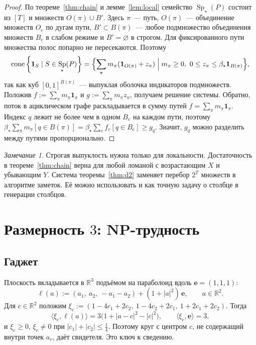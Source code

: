 \documentclass[a4paper,11pt]{article}
\theoremstyle{plain}
\theoremstyle{definition}
\theoremstyle{remark}
\newtheorem*{remark}{Замечание}
\newcommand{\R}{\mathbb{R}}
\newcommand{\abs}[1]{\left\lvert #1 \right\rvert}
\newcommand{\set}[1]{\left\{ #1 \right\}}
\newcommand{\ip}[2]{\langle #1, #2\rangle}
\DeclareMathOperator{\cone}{cone}
\DeclareMathOperator{\Sp}{Sp}
\newcommand{\Spm}{\Sp_\star}
\begin{document}
\begin{proof}
    По теореме~\ref{thm:chain} и лемме~\ref{lem:local} семейство $\Spm(P)$ состоит из $[T]$ и множеств $O(\pi)\cup B'$. Здесь $\pi$~--- путь, $O(\pi)$~--- объединение множеств $O_e$ по дугам пути, $B'\subset B(\pi)$~--- любое подмножество объединения множеств $B_e$ в слабом режиме и $B'=\varnothing$ в строгом. Для фиксированного пути множества полос попарно не пересекаются. Поэтому
    \[
        \cone\set{\mathbf 1_S\mid S\in\Spm(P)}=\Bigl\{\sum_\pi m_\pi(\mathbf 1_{O(\pi)}+z_\pi)\Bigm| m_\pi\ge0,\ 0\le z_\pi\le\beta_\star\mathbf 1_{B(\pi)}\Bigr\},
    \]
    так как куб $[0,1]^{B(\pi)}$~--- выпуклая оболочка индикаторов подмножеств. Положив $f:=\sum_\pi m_\pi\mathbf 1_\pi$ и $g:=\sum_\pi m_\pi z_\pi$, получаем решение системы. Обратно, поток в ациклическом графе раскладывается в сумму путей $f=\sum_\pi m_\pi\mathbf 1_\pi$. Индекс $q$ лежит не более чем в одном $B_e$ на каждом пути, поэтому $\beta_\star\sum_\pi m_\pi[q\in B(\pi)]=\beta_\star\sum_ef_e[q\in B_e]\ge g_q$. Значит, $g_q$ можно разделить между путями пропорционально.
\end{proof}

\begin{remark}
    Строгая выпуклость нужна только для локальности. Достаточность в теореме~\ref{thm:chain} верна для любой ломаной с возрастающим $X$ и убывающим $Y$. Система теоремы~\ref{thm:d2} заменяет перебор $2^T$ множеств в алгоритме заметок. Её можно использовать и как точную задачу о столбце в генерации столбцов.
\end{remark}

\section{Размерность $3$: NP-трудность}

\subsection{Гаджет}

Плоскость вкладывается в $\R^3$ подъёмом на параболоид вдоль $\mathbf e=(1,1,1)$:
\[
    \ell(a):=(a_1,\ a_2,\ -a_1-a_2)+(1+\abs a^2)\,\mathbf e,\qquad a\in\R^2.
\]
Для $c\in\R^2$ положим $\xi_c:=(1-4c_1+2c_2,\ 1-4c_2+2c_1,\ 1+2c_1+2c_2)$. Тогда
\[
    \ip{\xi_c}{\ell(a)}=3\bigl(1+\abs{a-c}^2-\abs c^2\bigr),\qquad \ip{\xi_c}{\mathbf e}=3,
\]
и $\xi_c\ge0$, $\xi_c\ne0$ при $\abs{c_1}+\abs{c_2}\le\tfrac14$. Поэтому круг с центром $c$, не содержащий внутри точек $a_r$, даёт свидетеля. Это ключ к сведению.
\end{document}
